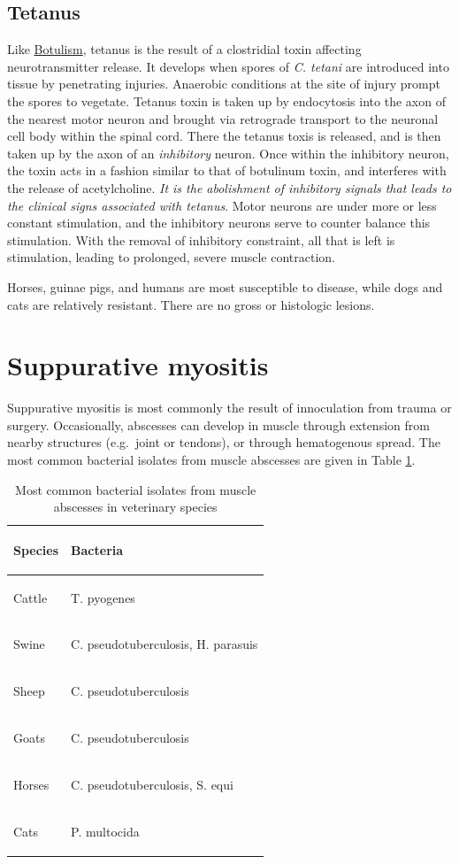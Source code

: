 \documentclass[openany]{book}
\begin{document}
\hypertarget{tetanus}{\subsection{Tetanus}\label{tetanus}}

Like \protect\hyperlink{botulism}{Botulism}, tetanus is the result of a
clostridial toxin affecting neurotransmitter release. It develops when
spores of \emph{C. tetani} are introduced into tissue by penetrating
injuries. Anaerobic conditions at the site of injury prompt the spores
to vegetate. Tetanus toxin is taken up by endocytosis into the axon of
the nearest motor neuron and brought via retrograde transport to the
neuronal cell body within the spinal cord. There the tetanus toxis is
released, and is then taken up by the axon of an \emph{inhibitory}
neuron. Once within the inhibitory neuron, the toxin acts in a fashion
similar to that of botulinum toxin, and interferes with the release of
acetylcholine. \emph{It is the abolishment of inhibitory signals that
leads to the clinical signs associated with tetanus}. Motor neurons are
under more or less constant stimulation, and the inhibitory neurons
serve to counter balance this stimulation. With the removal of
inhibitory constraint, all that is left is stimulation, leading to
prolonged, severe muscle contraction.

Horses, guinae pigs, and humans are most susceptible to disease, while
dogs and cats are relatively resistant. There are no gross or histologic
lesions.

\hypertarget{suppurative-myositis}{\section{Suppurative
myositis}\label{suppurative-myositis}}

Suppurative myositis is most commonly the result of innoculation from
trauma or surgery. Occasionally, abscesses can develop in muscle through
extension from nearby structures (e.g.~joint or tendons), or through
hematogenous spread. The most common bacterial isolates from muscle
abscesses are given in Table \ref{tab:abscess}.

\begin{table}[t]

\caption{\label{tab:abscess}Most common bacterial isolates from muscle abscesses in veterinary species}
\centering
\begin{tabular}{>{\raggedright\arraybackslash}p{15em}>{\em\raggedright\arraybackslash}p{15em}}
\toprule
Species & Bacteria\\
\midrule
Cattle & T. pyogenes\\
Swine & C. pseudotuberculosis, H. parasuis\\
Sheep & C. pseudotuberculosis\\
Goats & C. pseudotuberculosis\\
Horses & C. pseudotuberculosis, S. equi\\
\addlinespace
Cats & P. multocida\\
\bottomrule
\end{tabular}
\end{table}
\end{document}

